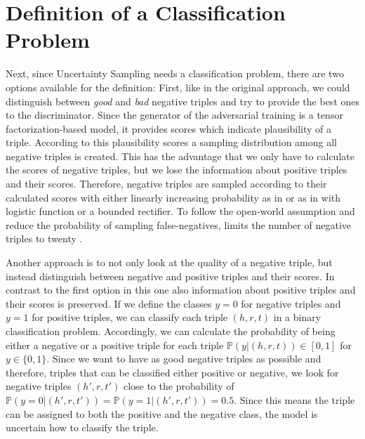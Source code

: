 \section{Definition of a Classification Problem}
\label{sec:definition_of_a_classification_problem}
Next, since Uncertainty Sampling needs a classification problem, there are two options available for the definition:
First, like in the original \kbgan approach, we could distinguish between \textit{good} and \textit{bad} negative triples and try to provide the best ones to the discriminator.
Since the generator of the adversarial training is a tensor factorization-based model, it provides scores which indicate plausibility of a triple.
According to this plausibility scores a sampling distribution among all negative triples is created. 
This has the advantage that we only have to calculate the scores of negative triples, but we lose the information about positive triples and their scores.
Therefore, negative triples are sampled according to their calculated scores with either linearly increasing probability as in \cite{cai2017kbgan} or as in \cite{UKGE} with logistic function or a bounded rectifier.
To follow the open-world assumption and reduce the probability of sampling false-negatives,
\kbgan limits the number of negative triples to twenty \cite{cai2017kbgan}.

Another approach is to not only look at the quality of a negative triple, but instead distinguish between negative and positive triples and their scores.
In contrast to the first option in this one also information about positive triples and their scores is preserved.
If we define the classes $y = 0$  for negative triples and $y = 1$ for positive triples, we can classify each triple $(h,r,t)$ in a binary classification problem.
Accordingly, we can calculate the probability of being either a negative or a positive triple for each triple $\mathbb{P}(y| (h,r,t)) \in [0,1]$ for $y \in \{0,1\}$.
Since we want to have as good negative triples as possible and therefore, triples that can be classified either positive or negative, we look for negative triples $(h',r,t')$ close to the probability of $\mathbb{P}(y = 0| (h',r,t')) = \mathbb{P}(y = 1| (h',r,t')) = 0.5$.
Since this means the triple can be assigned to both the positive and the negative class, 
the model is uncertain how to classify the triple.

